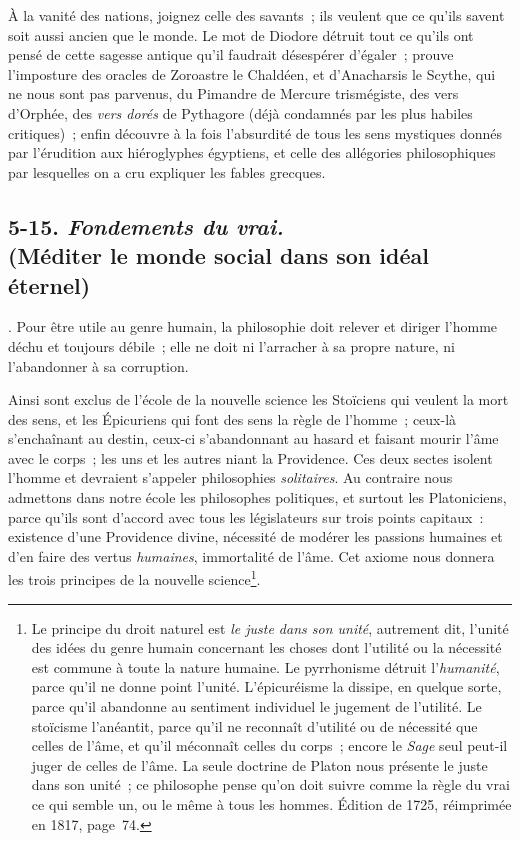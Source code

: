 \documentclass[french,twoside]{book} %
\begin{document}
À la vanité des nations, joignez celle des savants ; ils veulent que ce qu’ils savent soit aussi ancien que le monde. Le mot de Diodore détruit tout ce qu’ils ont pensé de cette sagesse antique qu’il faudrait désespérer d’égaler ; prouve l’imposture des oracles de Zoroastre le Chaldéen, et d’Anacharsis le Scythe, qui ne nous sont pas parvenus, du Pimandre de Mercure trismégiste, des vers d’Orphée, des {\itshape vers dorés} de Pythagore (déjà condamnés par les plus habiles critiques) ; enfin découvre à la fois l’absurdité de tous les sens mystiques donnés par l’érudition aux hiéroglyphes égyptiens, et celle des allégories philosophiques par lesquelles on a cru expliquer les fables grecques.
\subsection[{5-15. Fondements du vrai. (Méditer le monde social dans son idéal éternel)}]{5-15. {\itshape Fondements du vrai. }\\
(Méditer le monde social dans son idéal éternel)}
. Pour être utile au genre humain, la philosophie doit relever et diriger l’homme déchu et toujours débile ; elle ne doit ni l’arracher à sa propre nature, ni l’abandonner à sa corruption.\par
Ainsi sont exclus de l’école de la nouvelle science les Stoïciens qui veulent la mort des sens, et les Épicuriens qui font des sens la règle de l’homme ; ceux-là s’enchaînant au destin, ceux-ci s’abandonnant au hasard et faisant mourir l’âme avec le corps ; les uns et les autres niant la Providence. Ces deux sectes isolent l’homme et devraient s’appeler philosophies {\itshape solitaires}. Au contraire nous admettons dans notre école les philosophes politiques, et surtout les Platoniciens, parce qu’ils sont d’accord avec tous les législateurs sur trois points capitaux : existence d’une Providence divine, nécessité de modérer les passions humaines et d’en faire des vertus {\itshape humaines}, immortalité de l’âme. Cet axiome nous donnera les trois principes de la nouvelle science\footnote{Le principe du droit naturel est {\itshape le juste dans son unité}, autrement dit, l’unité des idées du genre humain concernant les choses dont l’utilité ou la nécessité est commune à toute la nature humaine. Le pyrrhonisme détruit l’{\itshape humanité}, parce qu’il ne donne point l’unité. L’épicuréisme la dissipe, en quelque sorte, parce qu’il abandonne au sentiment individuel le jugement de l’utilité. Le stoïcisme l’anéantit, parce qu’il ne reconnaît d’utilité ou de nécessité que celles de l’âme, et qu’il méconnaît celles du corps ; encore le {\itshape Sage} seul peut-il juger de celles de l’âme. La seule doctrine de Platon nous présente le juste dans son unité ; ce philosophe pense qu’on doit suivre comme la règle du vrai ce qui semble un, ou le même à tous les hommes. Édition de 1725, réimprimée en 1817, page 74.}.\par
\end{document}
